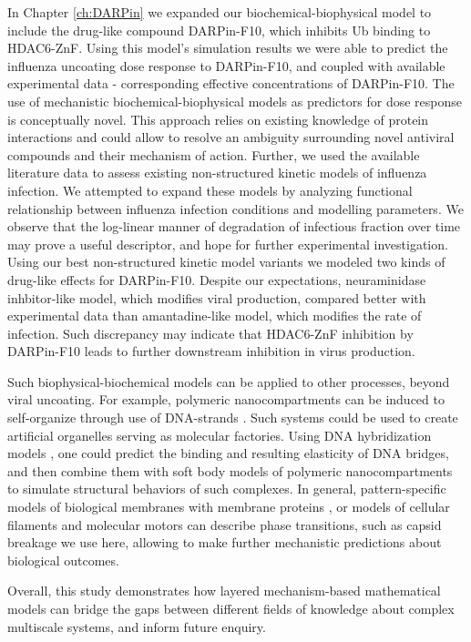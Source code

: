 In Chapter \ref{ch:DARPin} we expanded our biochemical-biophysical model to include the drug-like compound DARPin-F10, which inhibits Ub binding to HDAC6-ZnF. Using this model's simulation results we were able to predict the influenza uncoating dose response to DARPin-F10, and coupled with available experimental data - corresponding effective concentrations of DARPin-F10. The use of mechanistic biochemical-biophysical models as predictors for dose response is conceptually novel. This approach relies on existing knowledge of protein interactions and could allow to resolve an ambiguity surrounding novel antiviral compounds and their mechanism of action. Further, we used the available literature data \cite{rudiger2019multiscale, schulze2009infection} to assess existing non-structured kinetic models of influenza infection. We attempted to expand these models by analyzing functional relationship between influenza infection conditions and modelling parameters. We observe that the log-linear manner of degradation of infectious fraction over time may prove a useful descriptor, and hope for further experimental investigation. Using our best non-structured kinetic model variants we modeled two kinds of drug-like effects for DARPin-F10. Despite our expectations, neuraminidase inhbitor-like model, which modifies viral production, compared better with experimental data than amantadine-like model, which modifies the rate of infection. Such discrepancy may indicate that HDAC6-ZnF inhibition by DARPin-F10 leads to further downstream inhibition in virus production.

Such biophysical-biochemical models can be applied to other processes, beyond viral uncoating. For example, polymeric nanocompartments can be induced to self-organize through use of DNA-strands \cite{liu2016dna}. Such systems could be used to create artificial organelles serving as molecular factories. Using DNA hybridization models \cite{karamasioti2019computational}, one could predict the binding and resulting elasticity of DNA bridges, and then combine them with soft body models of polymeric nanocompartments to simulate structural behaviors of such complexes. In general, pattern-specific models of biological membranes \cite{cheng2019biological} with membrane proteins \cite{ayton2009systematic}, or models of cellular filaments and molecular motors \cite{chen2019remote} can describe phase transitions, such as capsid breakage we use here, allowing to make further mechanistic predictions about biological outcomes. 

Overall, this study demonstrates how layered mechanism-based mathematical models can bridge the gaps between different fields of knowledge about complex multiscale systems, and inform future enquiry.